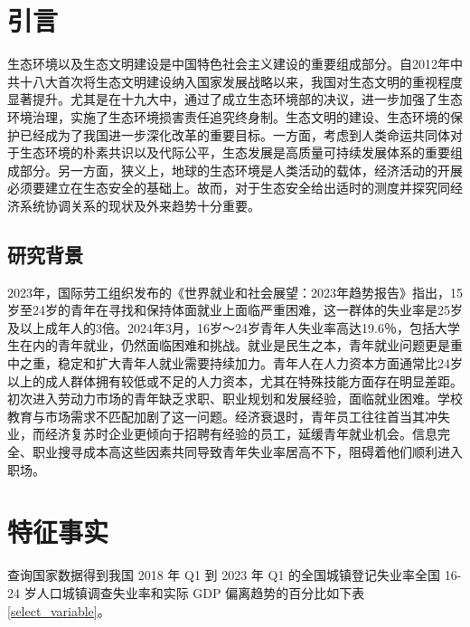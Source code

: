 
\iffalse
\fi


\setcounter{page}{1}                                 %
\song \xiaosionetwo
{}

\section{引言}

生态环境以及生态文明建设是中国特色社会主义建设的重要组成部分。自2012年中共十八大首次将生态文明建设纳入国家发展战略以来，我国对生态文明的重视程度显著提升。尤其是在十九大中，通过了成立生态环境部的决议，进一步加强了生态环境治理，实施了生态环境损害责任追究终身制。生态文明的建设、生态环境的保护已经成为了我国进一步深化改革的重要目标。一方面，考虑到人类命运共同体对于生态环境的朴素共识以及代际公平，生态发展是高质量可持续发展体系的重要组成部分。另一方面，狭义上，地球的生态环境是人类活动的载体，经济活动的开展必须要建立在生态安全的基础上。故而，对于生态安全给出适时的测度并探究同经济系统协调关系的现状及外来趋势十分重要。

\subsection{研究背景}
2023年，国际劳工组织发布的《世界就业和社会展望：2023年趋势报告》指出，15岁至24岁的青年在寻找和保持体面就业上面临严重困难，这一群体的失业率是25岁及以上成年人的3倍。2024年3月，16岁～24岁青年人失业率高达19.6％，包括大学生在内的青年就业，仍然面临困难和挑战。就业是民生之本，青年就业问题更是重中之重，稳定和扩大青年人就业需要持续加力。青年人在人力资本方面通常比24岁以上的成人群体拥有较低或不足的人力资本，尤其在特殊技能方面存在明显差距。初次进入劳动力市场的青年缺乏求职、职业规划和发展经验，面临就业困难。学校教育与市场需求不匹配加剧了这一问题。经济衰退时，青年员工往往首当其冲失业，而经济复苏时企业更倾向于招聘有经验的员工，延缓青年就业机会。信息完全、职业搜寻成本高这些因素共同导致青年失业率居高不下，阻碍着他们顺利进入职场。

\newpage

\section{特征事实}

查询国家数据得到我国 2018 年 Q1 到 2023 年 Q1 的全国城镇登记失业率全国 16-24 岁人口城镇调查失业率和实际 GDP 偏离趋势的百分比如下表\ref{select_variable}。


